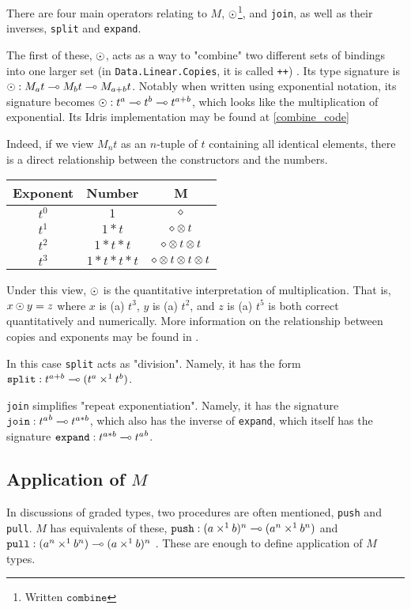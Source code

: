 There are four main operators relating to $M$, $\odot$\footnote{Written $\texttt{combine}$}, and \verb|join|, as well as their inverses, \verb|split| and \verb|expand|.

The first of these, $\odot$, acts as a way to "combine" two different sets of bindings into one larger set (in \verb|Data.Linear.Copies|, it is called \verb|++|) \cite{inverse_of_type,idris_linear}.
Its type signature is $\odot : M_a t \multimap M_b t \multimap M_{a+b} t$.
Notably when written using exponential notation, its signature becomes $\odot : t^a \multimap t^b \multimap t^{a+b}$, which looks like the multiplication of exponential. 
Its Idris implementation may be found at \ref{combine_code}

Indeed, if we view $M_n t$ as an $n$-tuple of $t$ containing all identical elements, there is a direct relationship between the constructors and the numbers.
\begin{tabular}{|c|c|c|}
	\hline
	Exponent & Number & M \\
	\hline
	\hline
	$t^0$ & $1$ & $\diamond$ \\
	\hline
	$t^1$ & $1*t$ & $\diamond \otimes t$ \\
	\hline
	$t^2$ & $1*t*t$ & $\diamond \otimes t \otimes t $ \\
	\hline
	$t^3$ & $1*t*t*t$ & $\diamond \otimes t \otimes t \otimes t $ \\
	\hline
\end{tabular}

Under this view, $\odot$ is the quantitative interpretation of multiplication.
That is, $x \odot y = z$ where $x$ is (a) $t^3$, $y$ is (a) $t^2$, and $z$ is (a) $t^5$ is both correct quantitatively and numerically.
More information on the relationship between copies and exponents may be found in .

In this case \verb|split| acts as "division". 
Namely, it has the form $\verb|split| : t^{a+b} \proc (t^a \lpair t^b)$.

\verb|join| simplifies "repeat exponentiation". 
Namely, it has the signature $\verb|join| : {t^a}^b \proc t^{a*b}$, which also has the inverse of \verb|expand|, which itself has the signature $\verb|expand| : t^{a*b} \proc {t^a}^b$.

\subsection{Application of $M$}

In discussions of graded types, two procedures are often mentioned, \verb|push| and \verb|pull|.
$M$ has equivalents of these, $\texttt{push} : (a \times^1 b)^n \multimap (a^n \times^1 b^n)$ and $\texttt{pull} : (a^n \times^1 b^n) \multimap (a \times^1 b)^n$ \cite{quant_graded_modal}. 
These are enough to define application of $M$ types.

